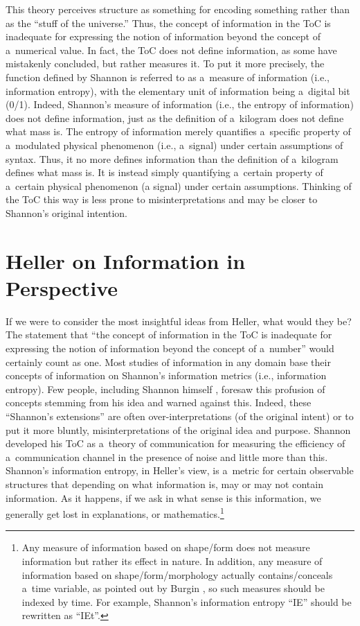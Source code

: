 This theory perceives structure as something for encoding something rather than as the ``stuff of the universe.'' Thus, the concept of information in the ToC is inadequate for expressing the notion of information beyond the concept of a~numerical value. In fact, the ToC does not define information, as some have mistakenly concluded, but rather measures it. To put it more precisely, the function defined by Shannon is referred to as a~measure of information (i.e., information entropy), with the elementary unit of information being a~digital bit (0/1). Indeed, Shannon's measure of information (i.e., the entropy of information) does not define information, just as the definition of a~kilogram does not define what mass is. The entropy of information merely quantifies a~specific property of a~modulated physical phenomenon (i.e., a~signal) under certain assumptions of syntax. Thus, it no more defines information than the definition of a~kilogram defines what mass is. It is instead simply quantifying a~certain property of a~certain physical phenomenon (a signal) under certain assumptions. Thinking of the ToC this way is less prone to misinterpretations and may be closer to Shannon's original intention.



\section{Heller on Information in Perspective}

If we were to consider the most insightful ideas from Heller, what would they be? The statement that ``the concept of information in the ToC is inadequate for expressing the notion of information beyond the concept of a~number'' would certainly count as one. Most studies of information in any domain base their concepts of information on Shannon's information metrics (i.e., information entropy). Few people, including Shannon himself 
\parencite[][]{shannon_bandwagon_1956}, %
 foresaw this profusion of concepts stemming from his idea and warned against this. Indeed, these ``Shannon's extensions'' are often over-interpretations (of the original intent) or to put it more bluntly, misinterpretations of the original idea and purpose. Shannon developed his ToC as a~theory of communication for measuring the efficiency of a~communication channel in the presence of noise and little more than this. Shannon's information entropy, in Heller's view, is a~metric for certain observable structures that depending on what information is, may or may not contain information. As it happens, if we ask in what sense is this information, we generally get lost in explanations, or mathematics.\footnote{Any measure of information based on shape/form does not measure information but rather its effect in nature. In addition, any measure of information based on shape/form/morphology actually contains/conceals a~time variable, as pointed out by Burgin 
\parencite*[][]{burgin_theory_2010}, %
 so such measures should be indexed by time. For example, Shannon's information entropy ``IE'' should be rewritten as ``IEt''.}



